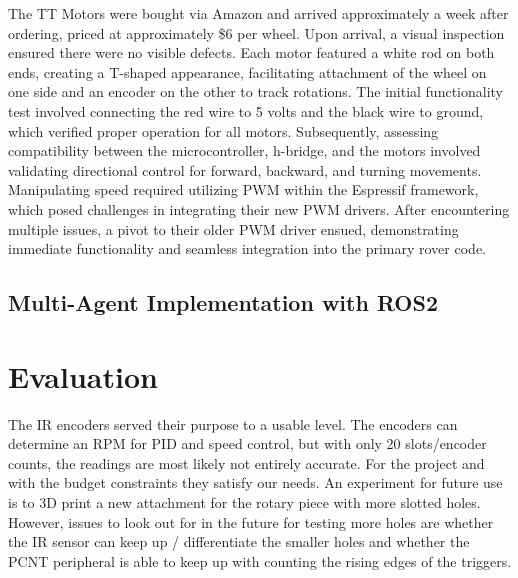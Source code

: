 \documentclass[conference]{IEEEtran}
\begin{document}
The TT Motors were bought via Amazon and arrived approximately a week after ordering, priced at approximately \$6 per wheel. Upon arrival, a visual inspection ensured there were no visible defects. Each motor featured a white rod on both ends, creating a T-shaped appearance, facilitating attachment of the wheel on one side and an encoder on the other to track rotations.
The initial functionality test involved connecting the red wire to 5 volts and the black wire to ground, which verified proper operation for all motors. Subsequently, assessing compatibility between the microcontroller, h-bridge, and the motors involved validating directional control for forward, backward, and turning movements. Manipulating speed required utilizing PWM within the Espressif framework, which posed challenges in integrating their new PWM drivers. After encountering multiple issues, a pivot to their older PWM driver ensued, demonstrating immediate functionality and seamless integration into the primary rover code.


\subsection{Multi-Agent Implementation with ROS2}

\section{Evaluation}
The IR encoders served their purpose to a usable level. The encoders can determine an RPM for PID and speed control, but with only 20 slots/encoder counts, the readings are most likely not entirely accurate. For the project and with the budget constraints they satisfy our needs. An experiment for future use is to 3D print a new attachment for the rotary piece with more slotted holes. However, issues to look out for in the future for testing more holes are whether the IR sensor can keep up / differentiate the smaller holes and whether the PCNT peripheral is able to keep up with counting the rising edges of the triggers.
\end{document}
